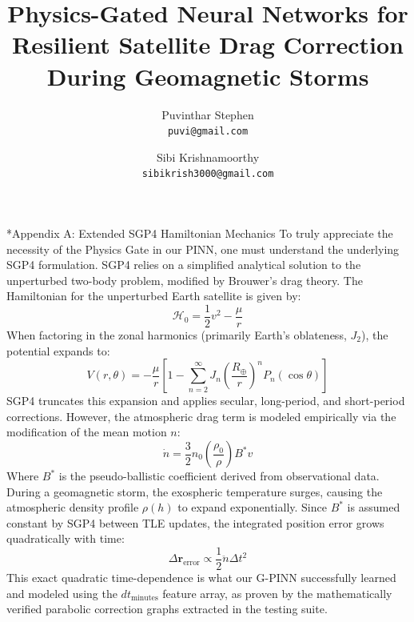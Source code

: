 \documentclass[twocolumn]{article}
\makeatletter
\def\subsection{\@startsection{subsection}{2}{\z@}{-8pt plus
    -2pt minus -2pt}{3pt plus 2pt minus 1pt}{\large\bf\raggedright}}
\makeatother
\begin{document}
\title{\textbf{Physics-Gated Neural Networks for Resilient Satellite Drag Correction During Geomagnetic Storms}}

\author{
  Puvinthar Stephen \\
  \texttt{puvi@gmail.com}
  \and
   Sibi Krishnamoorthy \\
   \texttt{sibikrish3000@gmail.com}
}

\maketitle







\subsection*{Appendix A: Extended SGP4 Hamiltonian Mechanics}
To truly appreciate the necessity of the Physics Gate in our PINN, one must understand the underlying SGP4 formulation. SGP4 relies on a simplified analytical solution to the unperturbed two-body problem, modified by Brouwer's drag theory. The Hamiltonian for the unperturbed Earth satellite is given by:
\begin{equation}
    \mathcal{H}_0 = \frac{1}{2}v^2 - \frac{\mu}{r}
\end{equation}
When factoring in the zonal harmonics (primarily Earth's oblateness, $J_2$), the potential expands to:
\begin{equation}
    V(r, \theta) = -\frac{\mu}{r} \left[ 1 - \sum_{n=2}^{\infty} J_n \left(\frac{R_\oplus}{r}\right)^n P_n(\cos \theta) \right]
\end{equation}
SGP4 truncates this expansion and applies secular, long-period, and short-period corrections. However, the atmospheric drag term is modeled empirically via the modification of the mean motion $n$:
\begin{equation}
    \dot{n} = \frac{3}{2} n_0 \left( \frac{\rho_0}{\rho} \right) B^* v
\end{equation}
Where $B^*$ is the pseudo-ballistic coefficient derived from observational data. During a geomagnetic storm, the exospheric temperature surges, causing the atmospheric density profile $\rho(h)$ to expand exponentially. Since $B^*$ is assumed constant by SGP4 between TLE updates, the integrated position error grows quadratically with time:
\begin{equation}
    \Delta \mathbf{r}_{\text{error}} \propto \frac{1}{2} \ddot{n} \Delta t^2
\end{equation}
This exact quadratic time-dependence is what our G-PINN successfully learned and modeled using the $dt_{\text{minutes}}$ feature array, as proven by the mathematically verified parabolic correction graphs extracted in the testing suite.
\end{document}
